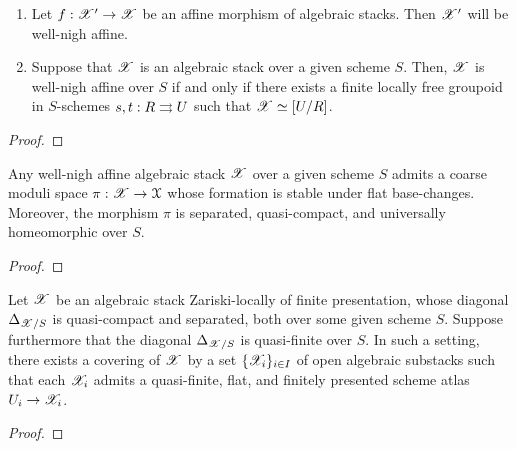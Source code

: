             \begin{proposition} \label{prop: well_nigh_affineness_criteria_for_algebraic_stacks}
                \noindent
                \begin{enumerate}
                    \item Let $f: \mathscr{X}' \to \mathscr{X}$ be an affine morphism of algebraic stacks. Then $\mathscr{X}'$ will be well-nigh affine.
                    \item Suppose that $\mathscr{X}$ is an algebraic stack over a given scheme $S$. Then, $\mathscr{X}$ is well-nigh affine over $S$ if and only if there exists a finite locally free groupoid in $S$-schemes $s, t: R \rightrightarrows U$ such that $\mathscr{X} \simeq [U/R]$. 
                \end{enumerate}
            \end{proposition}
                \begin{proof}
                    
                \end{proof}
            \begin{lemma} \label{lemma: existence_of_coarse_moduli_spaces_of_well_nigh_affine_algebraic_stacks}
                Any well-nigh affine algebraic stack $\mathscr{X}$ over a given scheme $S$ admits a coarse moduli space $\pi: \mathscr{X} \to \mathcal{X}$ whose formation is stable under flat base-changes. Moreover, the morphism $\pi$ is separated, quasi-compact, and universally homeomorphic over $S$.
            \end{lemma}
                \begin{proof}
                    
                \end{proof}
            \begin{lemma} \label{lemma: keel_mori_reduction_step}
                Let $\mathscr{X}$ be an algebraic stack Zariski-locally of finite presentation, whose diagonal $\Delta_{\mathscr{X}/S}$ is quasi-compact and separated, both over some given scheme $S$. Suppose furthermore that the diagonal $\Delta_{\mathscr{X}/S}$ is quasi-finite over $S$. In such a setting, there exists a covering of $\mathscr{X}$ by a set $\{\mathscr{X}_i\}_{i \in I}$ of open algebraic substacks such that each $\mathscr{X}_i$ admits a quasi-finite, flat, and finitely presented scheme atlas $U_i \to \mathscr{X}_i$.
            \end{lemma}
                \begin{proof}
                    
                \end{proof}
                
